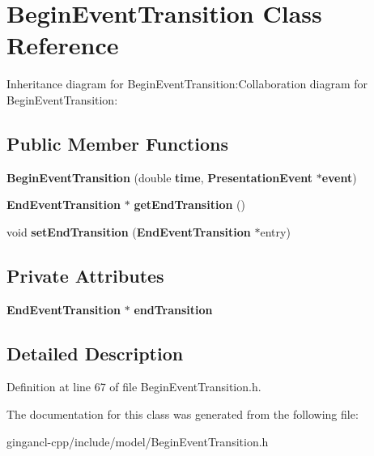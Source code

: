 \section{BeginEventTransition Class Reference}
\label{classbr_1_1pucrio_1_1telemidia_1_1ginga_1_1ncl_1_1model_1_1event_1_1transition_1_1BeginEventTransition}
Inheritance diagram for BeginEventTransition:Collaboration diagram for BeginEventTransition:\subsection*{Public Member Functions}
\begin{CompactItemize}
\item 
\textbf{BeginEventTransition} (double {\bf time}, {\bf PresentationEvent} $\ast${\bf event})\label{classbr_1_1pucrio_1_1telemidia_1_1ginga_1_1ncl_1_1model_1_1event_1_1transition_1_1BeginEventTransition_122235aeab3ce75572d6c4d51b97e31e}

\item 
{\bf EndEventTransition} $\ast$ \textbf{getEndTransition} ()\label{classbr_1_1pucrio_1_1telemidia_1_1ginga_1_1ncl_1_1model_1_1event_1_1transition_1_1BeginEventTransition_85948d2e21c9d388349c30d52c52cd47}

\item 
void \textbf{setEndTransition} ({\bf EndEventTransition} $\ast$entry)\label{classbr_1_1pucrio_1_1telemidia_1_1ginga_1_1ncl_1_1model_1_1event_1_1transition_1_1BeginEventTransition_f92b6acde922d42c2009534ea6e9d81e}

\end{CompactItemize}
\subsection*{Private Attributes}
\begin{CompactItemize}
\item 
{\bf EndEventTransition} $\ast$ {\bf endTransition}\label{classbr_1_1pucrio_1_1telemidia_1_1ginga_1_1ncl_1_1model_1_1event_1_1transition_1_1BeginEventTransition_ef939b9ff8c6468fbff649214bc0e026}

\end{CompactItemize}


\subsection{Detailed Description}




Definition at line 67 of file BeginEventTransition.h.

The documentation for this class was generated from the following file:\begin{CompactItemize}
\item 
gingancl-cpp/include/model/BeginEventTransition.h\end{CompactItemize}
